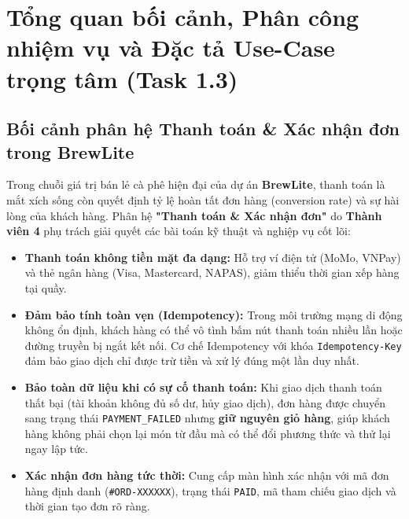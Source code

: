 \documentclass[a4paper]{article}
\begin{document}
\thispagestyle{empty}
\newpage
\tableofcontents
\newpage

\section{Tổng quan bối cảnh, Phân công nhiệm vụ và Đặc tả Use-Case trọng tâm (Task 1.3)}

\subsection{Bối cảnh phân hệ Thanh toán \& Xác nhận đơn trong BrewLite}
Trong chuỗi giá trị bán lẻ cà phê hiện đại của dự án \textbf{BrewLite}, thanh toán là mắt xích sống còn quyết định tỷ lệ hoàn tất đơn hàng (conversion rate) và sự hài lòng của khách hàng. Phân hệ \textbf{"Thanh toán \& Xác nhận đơn"} do \textbf{Thành viên 4} phụ trách giải quyết các bài toán kỹ thuật và nghiệp vụ cốt lõi:
\begin{itemize}
    \item \textbf{Thanh toán không tiền mặt đa dạng:} Hỗ trợ ví điện tử (MoMo, VNPay) và thẻ ngân hàng (Visa, Mastercard, NAPAS), giảm thiểu thời gian xếp hàng tại quầy.
    \item \textbf{Đảm bảo tính toàn vẹn (Idempotency):} Trong môi trường mạng di động không ổn định, khách hàng có thể vô tình bấm nút thanh toán nhiều lần hoặc đường truyền bị ngắt kết nối. Cơ chế Idempotency với khóa \texttt{Idempotency-Key} đảm bảo giao dịch chỉ được trừ tiền và xử lý đúng một lần duy nhất.
    \item \textbf{Bảo toàn dữ liệu khi có sự cố thanh toán:} Khi giao dịch thanh toán thất bại (tài khoản không đủ số dư, hủy giao dịch), đơn hàng được chuyển sang trạng thái \texttt{PAYMENT\_FAILED} nhưng \textbf{giữ nguyên giỏ hàng}, giúp khách hàng không phải chọn lại món từ đầu mà có thể đổi phương thức và thử lại ngay lập tức.
    \item \textbf{Xác nhận đơn hàng tức thời:} Cung cấp màn hình xác nhận với mã đơn hàng định danh (\texttt{\#ORD-XXXXXX}), trạng thái \texttt{PAID}, mã tham chiếu giao dịch và thời gian tạo đơn rõ ràng.
\end{itemize}
\end{document}
